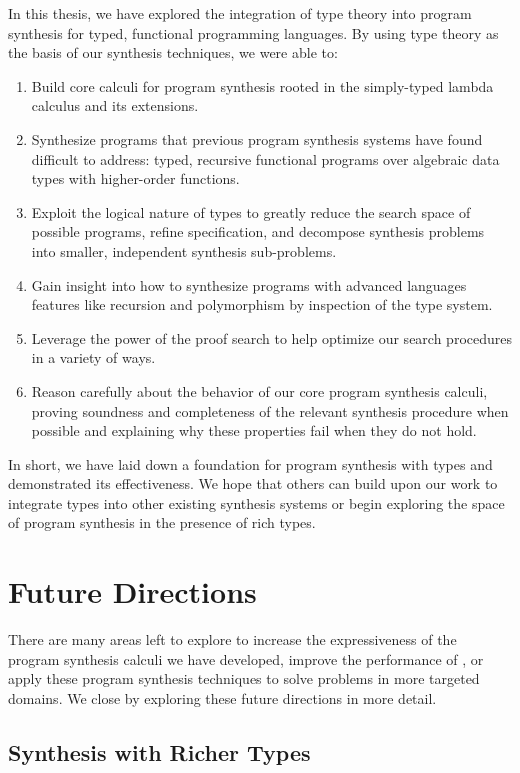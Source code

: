 In this thesis, we have explored the integration of type theory into program synthesis for typed, functional programming languages.
By using type theory as the basis of our synthesis techniques, we were able to:
\begin{enumerate}
  \item Build core calculi for program synthesis rooted in the simply-typed lambda calculus and its extensions.
  \item Synthesize programs that previous program synthesis systems have found difficult to address: typed, recursive functional programs over algebraic data types with higher-order functions.
  \item Exploit the logical nature of types to greatly reduce the search space of possible programs, refine specification, and decompose synthesis problems into smaller, independent synthesis sub-problems.
  \item Gain insight into how to synthesize programs with advanced languages features like recursion and polymorphism by inspection of the type system.
  \item Leverage the power of the proof search to help optimize our search procedures in a variety of ways.
  \item Reason carefully about the behavior of our core program synthesis calculi, proving soundness and completeness of the relevant synthesis procedure when possible and explaining why these properties fail when they do not hold.
\end{enumerate}
In short, we have laid down a foundation for program synthesis with types and demonstrated its effectiveness.
We hope that others can build upon our work to integrate types into other existing synthesis systems or begin exploring the space of program synthesis in the presence of rich types.

\section{Future Directions}
\label{sec:future-directions}

There are many areas left to explore to increase the expressiveness of the program synthesis calculi we have developed, improve the performance of \myth{}, or apply these program synthesis techniques to solve problems in more targeted domains.
We close by exploring these future directions in more detail.

\subsection{Synthesis with Richer Types}
\label{subsec:synthesis-with-richer-types}

